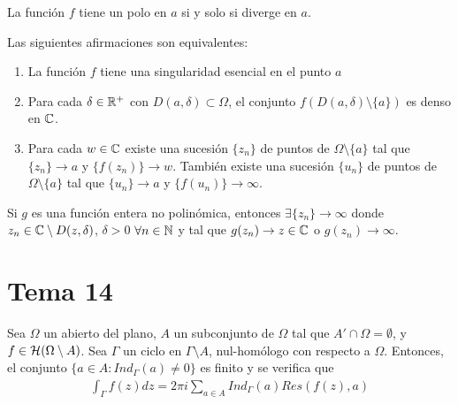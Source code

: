 \documentclass[12pt]{article}
\begin{document}
    \begin{prop}
        La función $f$ tiene un polo en $a$ si y solo si diverge en $a$.
    \end{prop}

    \begin{teo} Las siguientes afirmaciones son equivalentes:
    \begin{enumerate}
        \item La función $f$ tiene una singularidad esencial en el punto $a$
        \item Para cada $\delta \in \mathbb{R}^+$ con $D(a, \delta)\subset \Omega$, el conjunto $f(D(a, \delta)\setminus \{a\})$ es denso en $\mathbb{C}$.
        \item Para cada $w\in \mathbb{C}$ existe una sucesión $\{z_n\}$ de puntos de $\Omega \setminus \{a\}$ tal que $\{z_n\} \to a$ y $\{f(z_n)\}\to w$. También existe una sucesión $\{u_n\}$ de puntos de $\Omega \setminus \{a\}$ tal que $\{u_n\} \to a$ y $\{f(u_n)\} \to \infty$.
    \end{enumerate}
    \end{teo}

    \begin{coro}
        Si $g$ es una función entera no polinómica, entonces $\exists \{z_n\}\to \infty$ donde $z_n\in \mathbb{C}\setminus D(z, \delta)$, $\delta>0$ $\forall n \in \mathbb{N}$ y tal que $g(z_n) \to z\in \mathbb{C}$ o $g(z_n) \to \infty$.
    \end{coro}

    \newpage

    \section{Tema 14}

    \begin{teo}
        Sea $\Omega$ un abierto del plano, $A$ un subconjunto de $\Omega$ tal que $A'\cap \Omega = \emptyset$, y $f\in \mathcal{H}(\Omega \setminus A)$. Sea $\Gamma$ un ciclo en $\Gamma \setminus A$, nul-homólogo con respecto a $\Omega$. Entonces, el conjunto $\{a\in A : Ind_\Gamma(a)\neq 0\}$ es finito y se verifica que
        \begin{gather*}
            \int_\Gamma f(z)dz = 2\pi i \sum\limits_{a\in A} Ind_\Gamma (a) Res(f(z), a)
        \end{gather*}
    \end{teo}
\end{document}
